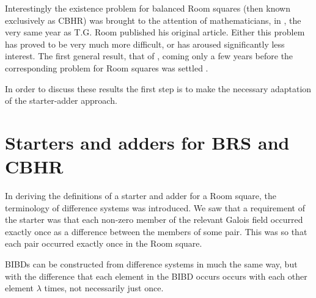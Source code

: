 \documentclass[
  11pt,
  a4paper]{book}
\begin{document}
Interestingly the existence problem for balanced Room squares (then
known exclusively as CBHR) was brought to the attention of
mathematicians, in \textcite{parker_balanced_1955}, the very same year
as T.G. Room published his original article. Either this problem has
proved to be very much more difficult, or has aroused significantly less
interest. The first general result, that of \textcite{hwang_more_1970},
coming only a few years before the corresponding problem for Room
squares was settled \textcite{wallis_existence_1973}.

In order to discuss these results the first step is to make the
necessary adaptation of the starter-adder approach.

\hypertarget{starters-and-adders-for-brs-and-cbhr}{%
\section{Starters and adders for BRS and
CBHR}\label{starters-and-adders-for-brs-and-cbhr}}

In deriving the definitions of a starter and adder for a Room square,
the terminology of difference systems was introduced. We saw that a
requirement of the starter was that each non-zero member of the relevant
Galois field occurred exactly once as a difference between the members
of some pair. This was so that each pair occurred exactly once in the
Room square.

BIBDs can be constructed from difference systems in much the same way,
but with the difference that each element in the BIBD occurs occurs with
each other element \(\lambda\) times, not necessarily just once.
\end{document}
